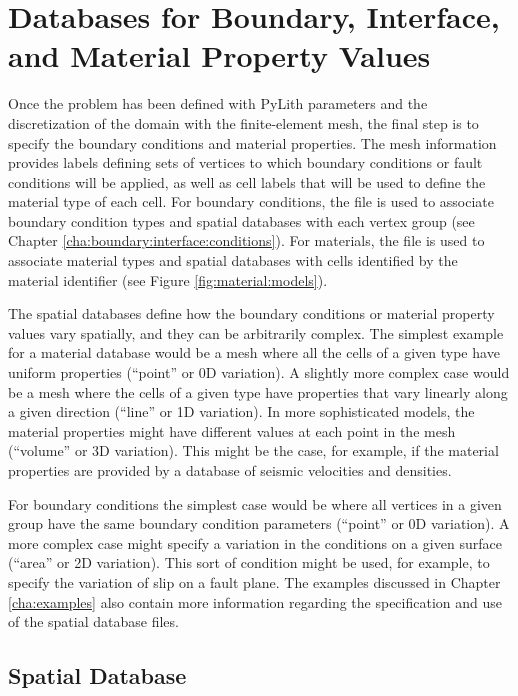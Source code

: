 \section{Databases for Boundary, Interface, and Material Property Values}
\label{sec:spatial:databases}

Once the problem has been defined with PyLith parameters and the
discretization of the domain with the finite-element mesh, the final
step is to specify the boundary conditions and material
properties. The mesh information provides labels defining sets of
vertices to which boundary conditions or fault conditions will be
applied, as well as cell labels that will be used to define the
material type of each cell. For boundary conditions, the
 file is used to associate boundary condition types and
spatial databases with each vertex group (see Chapter
\vref{cha:boundary:interface:conditions}).  For materials, the
 file is used to associate material types and spatial
databases with cells identified by the material identifier (see Figure
\vref{fig:material:models}).

The spatial databases define how the boundary conditions or material
property values vary spatially, and they can be arbitrarily complex.
The simplest example for a material database would be a mesh where all
the cells of a given type have uniform properties (``point'' or 0D
variation). A slightly more complex case would be a mesh where the
cells of a given type have properties that vary linearly along a given
direction (``line'' or 1D variation). In more sophisticated models,
the material properties might have different values at each point in
the mesh (``volume'' or 3D variation). This might be the case, for
example, if the material properties are provided by a database of
seismic velocities and densities.

For boundary conditions the simplest case would be where all vertices
in a given group have the same boundary condition parameters
(``point'' or 0D variation). A more complex case might specify a
variation in the conditions on a given surface (``area'' or 2D
variation). This sort of condition might be used, for example, to
specify the variation of slip on a fault plane. The examples discussed
in Chapter \vref{cha:examples} also contain more information regarding
the specification and use of the spatial database files.


\subsection{ Spatial Database}
\label{sec:SimpleDB}


